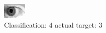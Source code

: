 \begin{figure}[h!]
\begin{center}
\includegraphics[width=0.60\columnwidth]{figures/ID179_class_4_target_3.png}
\end{center}
\caption{ Classification: 4 actual target: 3}
\label{fig:ID179_class_4_target_3}
\end{figure}
